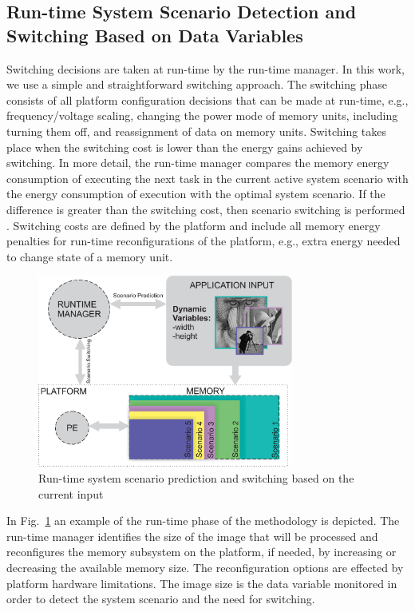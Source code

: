 \documentclass[smallextended]{svjour3}
\begin{document}
\subsection{Run-time System Scenario Detection and Switching Based on Data Variables}

Switching decisions are taken at run-time by the run-time manager. 
In this work, we use a simple and straightforward switching approach.
The switching phase consists of all platform configuration decisions that can be made at run-time, e.g., frequency/voltage scaling, changing the power mode of memory units, including turning them off, and reassignment of data on memory units. 
Switching takes place when the switching cost is lower than the energy gains achieved by switching. 
In more detail, the run-time manager compares the memory energy consumption of executing the next task in the current active system scenario with the energy consumption of execution with the optimal system scenario. 
If the difference is greater than the switching cost, then scenario switching is performed \cite{tcm}. 
Switching costs are defined by the platform and include all memory energy penalties for run-time reconfigurations of the platform, e.g., extra energy needed to change state of a memory unit.

\begin{figure}
\centering
\includegraphics[width=0.75\textwidth]{Images/switching.eps}
\caption{Run-time system scenario prediction and switching based on the current input}
\label{fig:runtime}
\end{figure}

In Fig.~\ref{fig:runtime} an example of the run-time phase of the methodology is depicted. 
The run-time manager identifies the size of the image that will be processed and reconfigures the memory subsystem on the platform, if needed, by increasing or decreasing the available memory size. 
The reconfiguration options are effected by platform hardware limitations. 
The image size is the data variable monitored in order to detect the system scenario and the need for switching.
\end{document}
